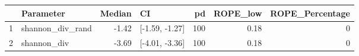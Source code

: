 \begin{table}[ht]
\centering
\begin{tabular}{llrlrrr}
  \hline
 & Parameter & Median & CI & pd & ROPE\_low & ROPE\_Percentage \\ 
  \hline
1 & shannon\_div\_rand & -1.42 & [-1.59, -1.27] & 100 & 0.18 & 0 \\ 
  2 & shannon\_div & -3.69 & [-4.01, -3.36] & 100 & 0.18 & 0 \\ 
   \hline
\end{tabular}
\end{table}


